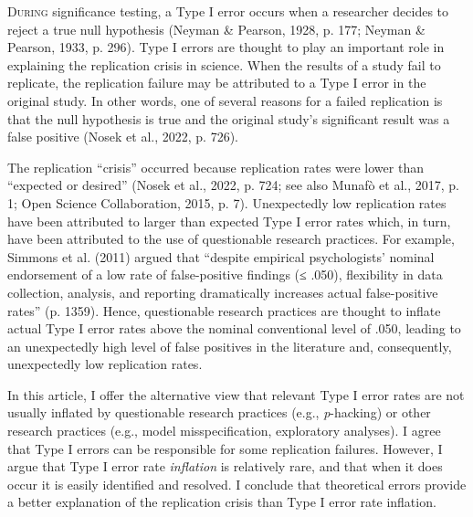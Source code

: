 \documentclass[authordate, meta, issue]{jote-new-article}
\author[1]{\mbox{Mark Rubin\orcid{0000-0002-6483-8561}}}
\affil[1]{Durham University}
\begin{document}
\begin{frontmatter}
  \maketitle

  \begin{abstract}
    \printabstracttext



  \end{abstract}

\end{frontmatter}










\lettrine{D}{uring} significance testing, a Type I error occurs when a researcher decides to reject a true null hypothesis (Neyman \& Pearson, 1928, p. 177; Neyman \& Pearson, 1933, p. 296). Type I errors are thought to play an important role in explaining the replication crisis in science. When the results of a study fail to replicate, the replication failure may be attributed to a Type I error in the original study. In other words, one of several reasons for a failed replication is that the null hypothesis is true and the original study's significant result was a false positive (Nosek et al., 2022, p. 726).



The replication “crisis” occurred because replication rates were lower than “expected or desired” (Nosek et al., 2022, p. 724; see also Munafò et al., 2017, p. 1; Open Science Collaboration, 2015, p. 7). Unexpectedly low replication rates have been attributed to larger than expected Type I error rates which, in turn, have been attributed to the use of questionable research practices. For example, Simmons et al. (2011) argued that “despite empirical psychologists' nominal endorsement of a low rate of false-positive findings (≤ .050), flexibility in data collection, analysis, and reporting dramatically increases actual false-positive rates” (p. 1359). Hence, questionable research practices are thought to inflate actual Type I error rates above the nominal conventional level of .050, leading to an unexpectedly high level of false positives in the literature and, consequently, unexpectedly low replication rates.



In this article, I offer the alternative view that relevant Type I error rates are not usually inflated by questionable research practices (e.g., \emph{p}-hacking) or other research practices (e.g., model misspecification, exploratory analyses). I agree that Type I errors can be responsible for some replication failures. However, I argue that Type I error rate \emph{inflation} is relatively rare, and that when it does occur it is easily identified and resolved. I conclude that theoretical errors provide a better explanation of the replication crisis than Type I error rate inflation.
\end{document}
